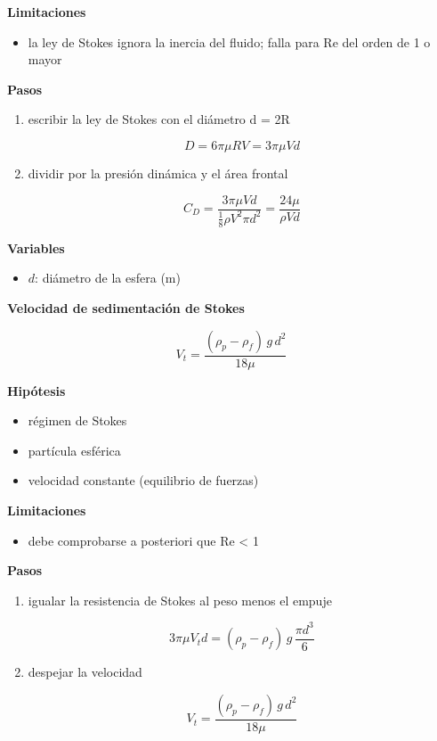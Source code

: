 \documentclass[10pt,openany]{book}
\begin{document}
\begin{tcolorbox}[title={Desarrollos del modelo}, studiumdef, breakable]
\noindent\textbf{Limitaciones}
\begin{itemize}
\item la ley de Stokes ignora la inercia del fluido; falla para Re del orden de 1 o mayor
\end{itemize}

\noindent\textbf{Pasos}
\begin{enumerate}
\item
escribir la ley de Stokes con el diámetro d = 2R

\[
D = 6\pi\mu R V = 3\pi\mu V d
\]
\item
dividir por la presión dinámica y el área frontal

\[
C_D = \frac{3\pi\mu V d}{\tfrac18\rho V^{2}\pi d^{2}} = \frac{24\mu}{\rho V d}
\]
\end{enumerate}

\noindent\textbf{Variables}
\begin{itemize}
\item $d$: diámetro de la esfera ($\mathrm{m}$)
\end{itemize}



\noindent\textbf{Velocidad de sedimentación de Stokes}

\begin{equation}
V_t = \frac{(\rho_p - \rho_f)\,g\,d^{2}}{18\mu}
\label{eq:c07-sedimentacion}
\end{equation}

\noindent\textbf{Hipótesis}
\begin{itemize}
\item régimen de Stokes
\item partícula esférica
\item velocidad constante (equilibrio de fuerzas)
\end{itemize}

\noindent\textbf{Limitaciones}
\begin{itemize}
\item debe comprobarse a posteriori que Re < 1
\end{itemize}

\noindent\textbf{Pasos}
\begin{enumerate}
\item
igualar la resistencia de Stokes al peso menos el empuje

\[
3\pi\mu V_t d = (\rho_p - \rho_f)\,g\,\frac{\pi d^{3}}{6}
\]
\item
despejar la velocidad

\[
V_t = \frac{(\rho_p - \rho_f)\,g\,d^{2}}{18\mu}
\]
\end{enumerate}


\end{tcolorbox}
\end{document}

